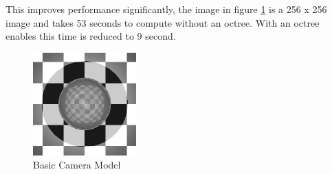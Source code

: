 \documentclass{article}
\begin{document}
This improves performance significantly, the image in figure \ref{fig:octree}
is a 256 x 256 image and takes 53 seconds to compute without an octree.
With an octree enables this time is reduced to 9 second.

\begin{figure}[H]
  \begin{center}
  \includegraphics[width=150px]{Images/octreeTest.png}
  \caption{Basic Camera Model}
  \label{fig:octree}
  \end{center}
\end{figure}



\end{document}
